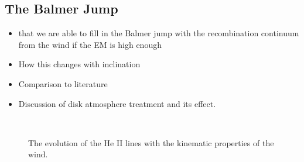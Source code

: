 \documentclass[preprint, a4paper, 11pt]{aastex}
\begin{document}
\subsection{The Balmer Jump}



\label{balmerjump}
\begin{itemize}
\item that we are able to fill in the Balmer jump with the recombination continuum from the wind
if the EM is high enough
\item How this changes with inclination
\item Comparison to literature
\item Discussion of disk atmosphere treatment and its effect.
\end{itemize}

\begin{figure} %
\mbox{
\quad
{}   
}
\caption{
The evolution of the He II lines with the kinematic properties
of the wind. 
}
\label{jump}
\end{figure}
\end{document}
